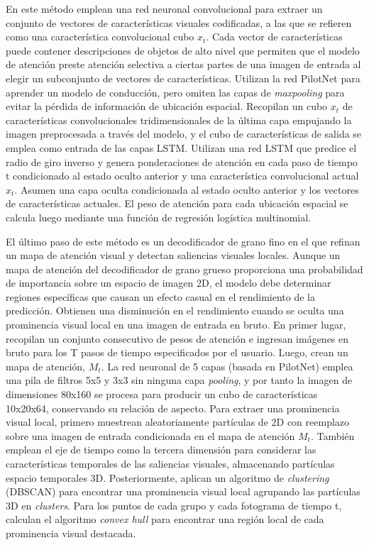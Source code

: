 En este método emplean una red neuronal convolucional para extraer un conjunto de vectores de características visuales codificadas, a las que se refieren como una característica convolucional cubo  $x_t$. Cada vector de características puede contener descripciones de objetos de alto nivel que permiten que el modelo de atención preste atención selectiva a ciertas partes de una imagen de entrada al elegir un subconjunto de vectores de características. Utilizan la red PilotNet \cite{end2end} para aprender un modelo de conducción, pero omiten las capas de \textit{maxpooling} para evitar la pérdida de información de ubicación espacial. Recopilan un cubo  $x_t$ de características convolucionales tridimensionales de la última capa empujando la imagen preprocesada a través del modelo, y el cubo de características de salida se emplea como entrada de las capas LSTM. Utilizan una red LSTM que predice el radio de giro inverso y genera ponderaciones de atención en cada paso de tiempo t condicionado al estado oculto anterior y una característica convolucional actual $x_t$. Asumen una capa oculta condicionada al estado oculto anterior y los vectores de características actuales. El peso de atención para cada ubicación espacial se calcula luego mediante una función de regresión logística multinomial.

El último paso de este método es un decodificador de grano fino en el que refinan un mapa de atención visual y detectan saliencias visuales locales. Aunque un mapa de atención del decodificador de grano grueso proporciona una probabilidad de importancia sobre un espacio de imagen 2D, el modelo debe determinar regiones específicas que causan un efecto casual en el rendimiento de la predicción. Obtienen una disminución en el rendimiento cuando se oculta una prominencia visual local en una imagen de entrada en bruto. En primer lugar, recopilan un conjunto consecutivo de pesos de atención e ingresan imágenes en bruto para los T pasos de  tiempo especificados por el usuario. Luego, crean un mapa de atención, $M_t$. La red neuronal de 5 capas (basada en PilotNet) emplea una pila de filtros 5x5 y 3x3 sin ninguna capa \textit{pooling}, y por tanto la imagen de dimensiones 80x160 se procesa para producir un cubo de características 10x20x64, conservando su relación de aspecto. Para extraer una prominencia visual local, primero muestrean aleatoriamente partículas de 2D con reemplazo sobre una imagen de entrada condicionada en el mapa de atención $M_t$. También emplean el eje de tiempo como la tercera dimensión para considerar las características temporales de las saliencias visuales, almacenando partículas espacio temporales 3D. Posteriormente, aplican un algoritmo de \textit{clustering} (DBSCAN) para encontrar una prominencia visual local agrupando las partículas 3D en \textit{clusters}. Para los puntos de cada grupo y cada fotograma de tiempo t, calculan el algoritmo \textit{convex hull} para encontrar una región local de cada prominencia visual destacada.


